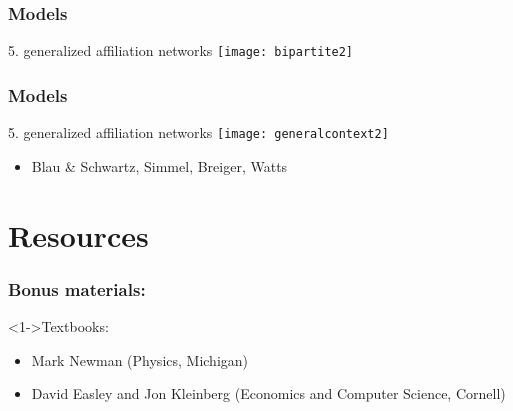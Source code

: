 \begin{frame}
  \frametitle{Models}

  \begin{block}{5. generalized affiliation networks}
    \centering
    \texttt{[image: bipartite2]}
  \end{block}

\end{frame}

\begin{frame}
  \frametitle{Models}

  \begin{block}{5. generalized affiliation networks}
    \texttt{[image: generalcontext2]}  
    \begin{itemize}
    \item Blau \& Schwartz\cite{blau1984a}, Simmel\cite{simmel1902a}, Breiger\cite{breiger1974a}, Watts \etal\cite{watts2002b}
    \end{itemize}
  \end{block}


\end{frame}

\section{Resources}

\begin{frame}
  \frametitle{Bonus materials:}

  \begin{block}<1->{Textbooks:}
    \begin{itemize}
      \item \small
        Mark Newman (Physics, Michigan)\\
      \item \small
        David Easley and Jon Kleinberg (Economics and Computer Science, Cornell)\\
    \end{itemize}
  \end{block}

\end{frame}

